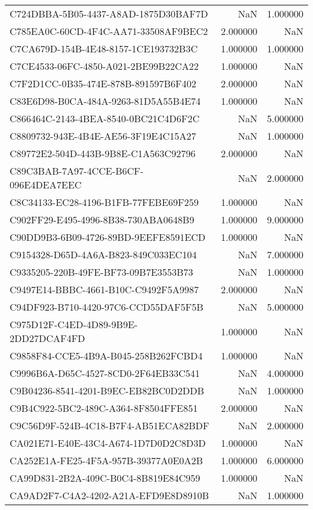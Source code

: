 \begin{tabular}{lrr}
C724DBBA-5B05-4437-A8AD-1875D30BAF7D & NaN & 1.000000 \\
C785EA0C-60CD-4F4C-AA71-33508AF9BEC2 & 2.000000 & NaN \\
C7CA679D-154B-4E48-8157-1CE193732B3C & 1.000000 & 1.000000 \\
C7CE4533-06FC-4850-A021-2BE99B22CA22 & 1.000000 & NaN \\
C7F2D1CC-0B35-474E-878B-891597B6F402 & 2.000000 & NaN \\
C83E6D98-B0CA-484A-9263-81D5A55B4E74 & 1.000000 & NaN \\
C866464C-2143-4BEA-8540-0BC21C4D6F2C & NaN & 5.000000 \\
C8809732-943E-4B4E-AE56-3F19E4C15A27 & NaN & 1.000000 \\
C89772E2-504D-443B-9B8E-C1A563C92796 & 2.000000 & NaN \\
C89C3BAB-7A97-4CCE-B6CF-096E4DEA7EEC & NaN & 2.000000 \\
C8C34133-EC28-4196-B1FB-77FEBE69F259 & 1.000000 & NaN \\
C902FF29-E495-4996-8B38-730ABA0648B9 & 1.000000 & 9.000000 \\
C90DD9B3-6B09-4726-89BD-9EEFE8591ECD & 1.000000 & NaN \\
C9154328-D65D-4A6A-B823-849C033EC104 & NaN & 7.000000 \\
C9335205-220B-49FE-BF73-09B7E3553B73 & NaN & 1.000000 \\
C9497E14-BBBC-4661-B10C-C9492F5A9987 & 2.000000 & NaN \\
C94DF923-B710-4420-97C6-CCD55DAF5F5B & NaN & 5.000000 \\
C975D12F-C4ED-4D89-9B9E-2DD27DCAF4FD & 1.000000 & NaN \\
C9858F84-CCE5-4B9A-B045-258B262FCBD4 & 1.000000 & NaN \\
C9996B6A-D65C-4527-8CD0-2F64EB33C541 & NaN & 4.000000 \\
C9B04236-8541-4201-B9EC-EB82BC0D2DDB & NaN & 1.000000 \\
C9B4C922-5BC2-489C-A364-8F8504FFE851 & 2.000000 & NaN \\
C9C56D9F-524B-4C18-B7F4-AB51ECA82BDF & NaN & 2.000000 \\
CA021E71-E40E-43C4-A674-1D7D0D2C8D3D & 1.000000 & NaN \\
CA252E1A-FE25-4F5A-957B-39377A0E0A2B & 1.000000 & 6.000000 \\
CA99D831-2B2A-409C-B0C4-8B819E84C959 & 1.000000 & NaN \\
CA9AD2F7-C4A2-4202-A21A-EFD9E8D8910B & NaN & 1.000000 \\

\end{tabular}
